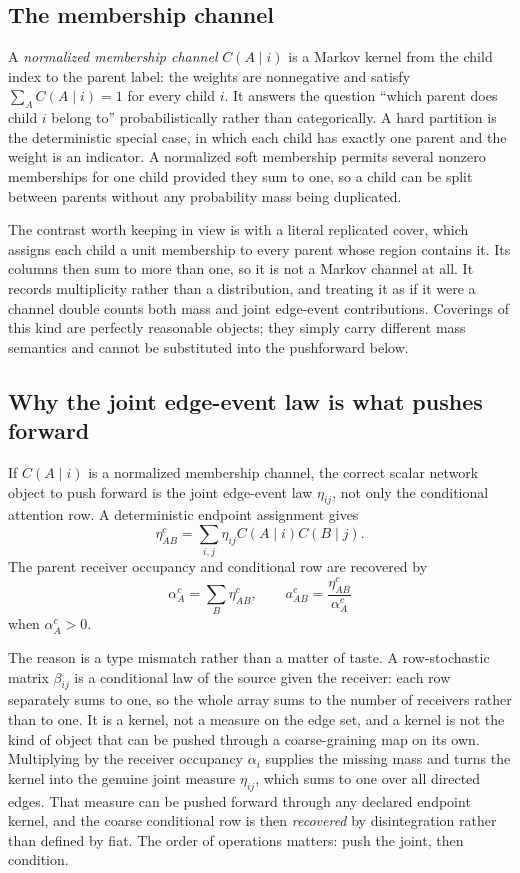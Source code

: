 \documentclass[11pt,letterpaper]{article}
\begin{document}
\subsection{The membership channel}

A \emph{normalized membership channel} \(C(A\mid i)\) is a Markov kernel from the child index to the parent label: the weights are nonnegative and satisfy \(\sum_A C(A\mid i)=1\) for every child \(i\). It answers the question ``which parent does child \(i\) belong to'' probabilistically rather than categorically. A hard partition is the deterministic special case, in which each child has exactly one parent and the weight is an indicator. A normalized soft membership permits several nonzero memberships for one child provided they sum to one, so a child can be split between parents without any probability mass being duplicated.

The contrast worth keeping in view is with a literal replicated cover, which assigns each child a unit membership to every parent whose region contains it. Its columns then sum to more than one, so it is not a Markov channel at all. It records multiplicity rather than a distribution, and treating it as if it were a channel double counts both mass and joint edge-event contributions. Coverings of this kind are perfectly reasonable objects; they simply carry different mass semantics and cannot be substituted into the pushforward below.

\subsection{Why the joint edge-event law is what pushes forward}

If \(C(A\mid i)\) is a normalized membership channel, the correct scalar network object to push forward is the joint edge-event law \(\eta_{ij}\), not only the conditional attention row. A deterministic endpoint assignment gives
\[
  \eta_{AB}^{c}
  =
  \sum_{i,j}
  \eta_{ij}
  C(A\mid i)C(B\mid j).
\]
The parent receiver occupancy and conditional row are recovered by
\[
  \alpha_A^c=\sum_B\eta_{AB}^c,
  \qquad
  a_{AB}^c=\frac{\eta_{AB}^c}{\alpha_A^c}
\]
when \(\alpha_A^c>0\).

The reason is a type mismatch rather than a matter of taste. A row-stochastic matrix \(\beta_{ij}\) is a conditional law of the source given the receiver: each row separately sums to one, so the whole array sums to the number of receivers rather than to one. It is a kernel, not a measure on the edge set, and a kernel is not the kind of object that can be pushed through a coarse-graining map on its own. Multiplying by the receiver occupancy \(\alpha_i\) supplies the missing mass and turns the kernel into the genuine joint measure \(\eta_{ij}\), which sums to one over all directed edges. That measure can be pushed forward through any declared endpoint kernel, and the coarse conditional row is then \emph{recovered} by disintegration rather than defined by fiat. The order of operations matters: push the joint, then condition.
\end{document}
